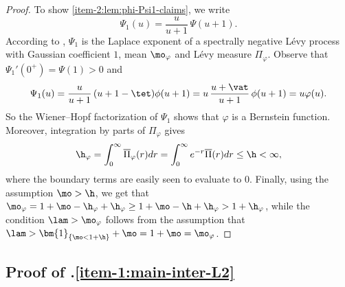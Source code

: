 \begin{proof}
To show \eqref{item-2:lem:phi-Psi1-claims}, we write
\[
\Psi_1(u)=\frac{u}{u+1}\,\Psi(u+1).
\]
According to \cite[Prop.\,2.2]{Chazal2014}, $\Psi_1$ is the Laplace exponent of a spectrally negative Lévy process with Gaussian coefficient $1$, mean $\mo_\varphi$ and Lévy measure $\Pi_\varphi$. Observe that~$\Psi_1'(0^+) = \Psi(1) > 0$ and
\begin{equation*}
\Psi_1(u) = \frac{u}{u+1}\,(u+1-\tet)\phi(u+1) = u \,\frac{u+\vat}{u+1}\,\phi(u+1) = u\varphi(u).
\end{equation*}
So the Wiener--Hopf factorization of $\Psi_1$ shows that $\varphi$ is a Bernstein function. Moreover, integration by parts of $\Pi_\varphi$ gives
\begin{equation*}
\h_\varphi = \int_0^\infty \overline{\Pi}_\varphi (r)dr = \int_0^\infty e^{-r}\overline{\Pi}(r)dr \leq \h < \infty,
\end{equation*}
where the boundary terms are easily seen to evaluate to 0. Finally, using the assumption $\mo > \h$, we get that $\mo_\varphi = 1+\mo-\h_\varphi+\h_\varphi \geq 1+\mo-\h+\h_\varphi > 1+\h_\varphi$, while the condition $\lam > \mo_\varphi$ follows from the assumption that $\lam > \bm{1}_{\{\mo < 1+\h\}} +\mo = 1+\mo = \mo_\varphi$.
\end{proof}

\subsection{Proof of .\eqref{item-1:main-inter-L2}}


